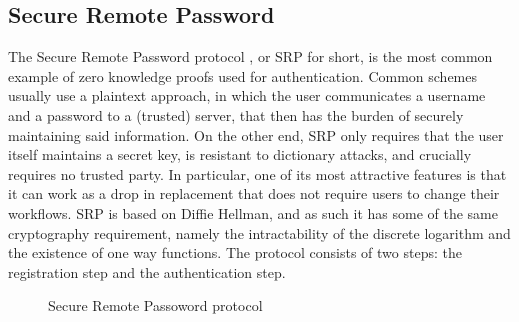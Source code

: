 \documentclass{article}
\begin{document}
\subsection{Secure Remote Password}
The Secure Remote Password protocol \cite{wuSecureRemotePassword1997}, or SRP for short, is the most common
example of zero knowledge proofs used for authentication. Common schemes usually use a plaintext approach,
in which the user communicates a username and a password to a (trusted) server, that then has the burden of securely maintaining said information.
On the other end, SRP only requires that
the user itself maintains a secret key, is resistant to dictionary attacks, and crucially requires no trusted party.
In particular, one of its most attractive features is that it can work as a drop in replacement that does not require users
to change their workflows.
SRP is based on Diffie Hellman, and as such it has some of the same cryptography requirement, namely the intractability
of the discrete logarithm and the existence of one way functions.
The protocol consists of two steps: the registration step and the authentication step.

\begin{figure}[H]
    \centering
    \caption{Secure Remote Passoword protocol}
    \label{srp}
\end{figure}
\end{document}
